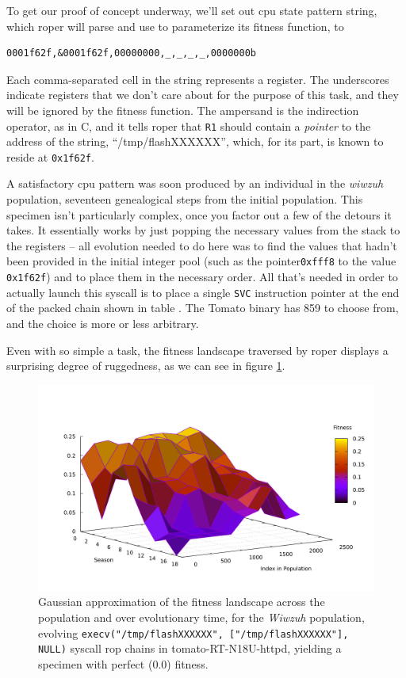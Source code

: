 \documentclass[12pt,glossary]{dalthesis}
\begin{document}
To get our proof of concept underway, we'll set out \gls{cpu} state pattern string,
which \gls{roper} will parse and use to parameterize its fitness function, to
\begin{verbatim}
0001f62f,&0001f62f,00000000,_,_,_,_,0000000b
\end{verbatim}
Each comma-separated cell in the string represents a register. The underscores indicate
registers that we don't care about for the purpose of this task, and they will be
ignored by the fitness function. The ampersand is the indirection operator, as in C, 
and it tells \gls{roper} that \texttt{R1} should contain a \emph{pointer} to the address of the
string, ``/tmp/flashXXXXXX'', which, for its part, is known to reside at \texttt{0x1f62f}. 

A satisfactory \gls{cpu} pattern was soon produced by an individual in the \emph{wiwzuh} 
population, seventeen genealogical steps from the initial population. This specimen
isn't particularly complex, once you factor out a few of the detours it takes. 
It essentially works by just popping the necessary values from the stack to the
registers -- all evolution needed to do here was to find the values that 
hadn't been provided in the initial integer pool (such as the pointer\texttt{0xfff8} to the
value \texttt{0x1f62f}) and to place them in the necessary order. All that's needed in order
to actually launch this syscall is to place a single \texttt{SVC} instruction pointer
at the end of the packed chain shown in table \label{fig:wiwzuh}. The Tomato binary
has 859 to choose from, and the choice is more or less arbitrary. 

Even with so simple a task, the fitness landscape traversed by \gls{roper} displays
a surprising degree of ruggedness, as we can see in figure \ref{fig:org53c7959}. 

\begin{figure}[htbp]
\centering
\includegraphics[width=.9\linewidth]{../images/plots/wiwzuh_syscall_gaussian_3.pdf}
\caption{\label{fig:org53c7959}
Gaussian approximation of the fitness landscape across the population and over evolutionary time, for the \emph{Wiwzuh} population, evolving \texttt{execv("/tmp/flashXXXXXX", ["/tmp/flashXXXXXX"], NULL)} syscall \gls{rop} chains in tomato-RT-N18U-httpd, yielding a specimen with perfect (0.0) fitness.}
\end{figure}
\end{document}
